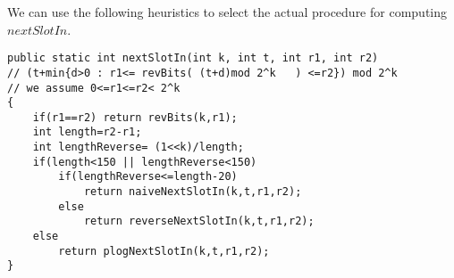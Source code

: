 We can use the following heuristics to select the 
actual procedure for computing $nextSlotIn$.
\begin{verbatim}
public static int nextSlotIn(int k, int t, int r1, int r2)
// (t+min{d>0 : r1<= revBits( (t+d)mod 2^k   ) <=r2}) mod 2^k 
// we assume 0<=r1<=r2< 2^k 
{
    if(r1==r2) return revBits(k,r1);
    int length=r2-r1;
    int lengthReverse= (1<<k)/length;
    if(length<150 || lengthReverse<150)
        if(lengthReverse<=length-20)
            return naiveNextSlotIn(k,t,r1,r2);
        else
            return reverseNextSlotIn(k,t,r1,r2);
    else
        return plogNextSlotIn(k,t,r1,r2);
}
\end{verbatim}

